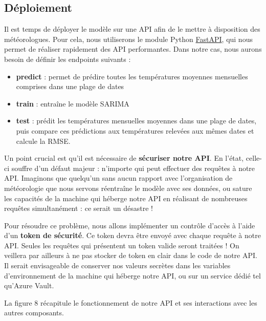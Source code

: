 \documentclass[french]{article}
\begin{document}
    \subsection{Déploiement}

    Il est temps de déployer le modèle sur une API afin de le mettre à disposition des météorologues. Pour cela, nous utiliserons le module Python \href{https://fastapi.tiangolo.com/}{FastAPI}, qui nous permet de réaliser rapidement des API performantes.
    Dans notre cas, nous aurons besoin de définir les endpoints suivants :
    \begin{itemize}
        \item \textbf{predict} : permet de prédire toutes les températures moyennes mensuelles comprises dans une plage de dates
        \item \textbf{train} : entraîne le modèle SARIMA
        \item \textbf{test} : prédit les températures mensuelles moyennes dans une plage de dates, puis compare ces prédictions aux températures relevées aux mêmes dates et calcule la RMSE.
    \end{itemize}

    Un point crucial est qu'il est nécessaire de \textbf{sécuriser notre API}. En l'état, celle-ci souffre d'un défaut majeur : n'importe qui peut effectuer des requêtes à notre API. Imaginons que quelqu'un sans aucun rapport avec l'organisation de météorologie que nous servons réentraîne le modèle avec ses données, ou sature les capacités de la machine qui héberge notre API en réalisant de nombreuses requêtes simultanément : ce serait un désastre !

    Pour résoudre ce problème, nous allons implémenter un contrôle d'accès à l'aide d'un \textbf{token de sécurité}. Ce token devra être envoyé avec chaque requête à notre API. Seules les requêtes qui présentent un token valide seront traitées ! On veillera par ailleurs à ne pas stocker de token en clair dans le code de notre API. Il serait envisageable de conserver nos valeurs secrètes dans les variables d'environnement de la machine qui héberge notre API, ou sur un service dédié tel qu'Azure Vault. 


    La figure 8 récapitule le fonctionnement de notre API et ses interactions avec les autres composants.
\end{document}
